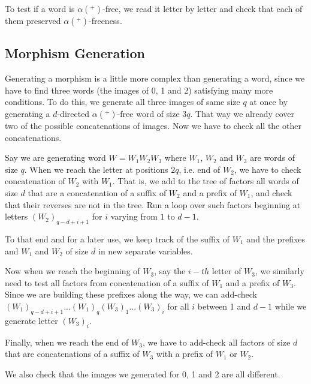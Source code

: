 \documentclass[a4paper]{article}
\newcommand{\oii}[1]{\todo[color=green!30,inline]{#1}}
\theoremstyle{definition}
\begin{document}
To test if a word is $\alpha(^+)$-free, we read it letter by letter and check that each of them preserved $\alpha(^+)$-freeness.

\subsection{Morphism Generation}

Generating a morphism is a little more complex than generating a word, since we have to find three words (the images of 0, 1 and 2) satisfying many more conditions. To do this, we generate all three images of same size $q$ at once by generating a $d$-directed $\alpha(^+)$-free word of size $3q$. That way we already cover two of the possible concatenations of images. Now we have to check all the other concatenations.

Say we are generating word $W = W_1W_2W_3$ where $W_1$, $W_2$ and $W_3$ are words of size $q$. When we reach the letter at positions $2q$, i.e. end of $W_2$, we have to check concatenation of $W_2$ with $W_1$. That is, we add to the tree of factors all words of size $d$ that are a concatenation of a suffix of $W_2$ and a prefix of $W_1$, and check that their reverses are not in the tree. Run a loop over such factors beginning at letters $(W_2)_{q-d+i+1}$ for $i$ varying from $1$ to $d-1$.

To that end and for a later use, we keep track of the suffix of $W_1$ and the prefixes and $W_1$ and $W_2$ of size $d$ in new separate variables.

Now when we reach the beginning of $W_3$, say the $i-th$ letter of $W_3$, we similarly need to test all factors from concatenation of a suffix of $W_1$ and a prefix of $W_3$. Since we are building these prefixes along the way, we can add-check $(W_1)_{q-d+i+1}...(W_1)_q(W_3)_1...(W_3)_i$ for all $i$ between 1 and $d-1$ while we generate letter $(W_3)_i$.

Finally, when we reach the end of $W_3$, we have to add-check all factors of size $d$ that are concatenations of a suffix of $W_3$ with a prefix of $W_1$ or $W_2$.

We also check that the images we generated for 0, 1 and 2 are all different.
\end{document}
